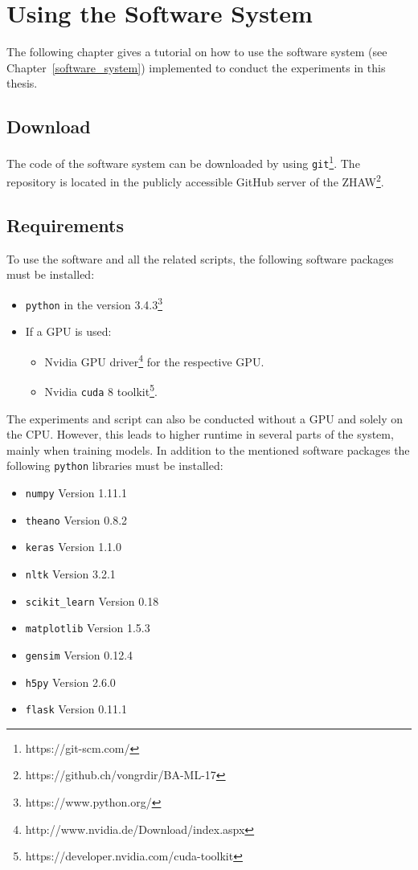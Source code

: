\chapter{Using the Software System}
\label{appendix:software_usage}
The following chapter gives a tutorial on how to use the software system (see Chapter~\ref{software_system}) implemented to conduct the experiments in this thesis.

\section{Download}
The code of the software system can be downloaded by using \texttt{git}\footnote{https://git-scm.com/}. The repository is located in the publicly accessible GitHub server of the ZHAW\footnote{https://github.ch/vongrdir/BA-ML-17}.

\section{Requirements}
To use the software and all the related scripts, the following software packages must be installed:

\begin{itemize}[noitemsep]
	\item \texttt{python} in the version 3.4.3\footnote{https://www.python.org/}
	\item If a GPU is used:
	\begin{itemize}[noitemsep]
		\item Nvidia GPU driver\footnote{http://www.nvidia.de/Download/index.aspx} for the respective GPU.
		\item Nvidia \texttt{cuda} 8 toolkit\footnote{https://developer.nvidia.com/cuda-toolkit}.
	\end{itemize}
\end{itemize}

The experiments and script can also be conducted without a GPU and solely on the CPU. However, this leads to higher runtime in several parts of the system, mainly when training models. In addition to the mentioned software packages the following \texttt{python} libraries must be installed:

\begin{itemize}[noitemsep]
	\item \texttt{numpy} Version 1.11.1
	\item \texttt{theano} Version 0.8.2
	\item \texttt{keras} Version 1.1.0
	\item \texttt{nltk} Version 3.2.1
	\item \texttt{scikit{\_}learn} Version 0.18
	\item \texttt{matplotlib} Version 1.5.3
	\item \texttt{gensim} Version 0.12.4
	\item \texttt{h5py} Version 2.6.0
	\item \texttt{flask} Version 0.11.1
\end{itemize}

